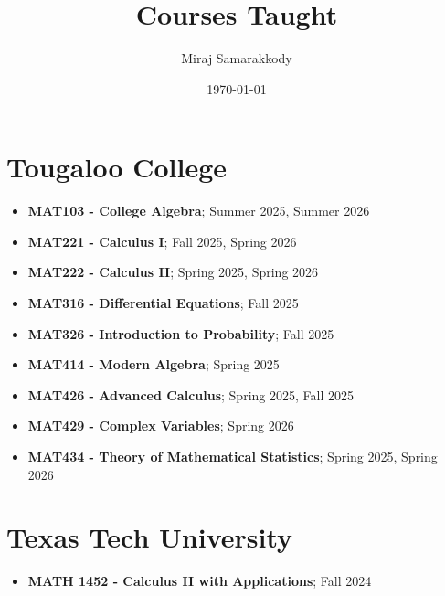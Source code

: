 \documentclass[11pt]{article}
\title{Courses Taught}
\author{Miraj Samarakkody}
\date{\today}
\begin{document}
\maketitle

\section*{Tougaloo College}
\begin{itemize}
	\item \textbf{MAT103 - College Algebra}; Summer 2025, Summer 2026
	\item \textbf{MAT221 - Calculus I}; Fall 2025, Spring 2026
	\item \textbf{MAT222 - Calculus II}; Spring 2025, Spring 2026
	\item \textbf{MAT316 - Differential Equations}; Fall 2025
	\item \textbf{MAT326 - Introduction to Probability}; Fall 2025
	\item \textbf{MAT414 - Modern Algebra}; Spring 2025
	\item \textbf{MAT426 - Advanced Calculus}; Spring 2025, Fall 2025
	\item \textbf{MAT429 - Complex Variables}; Spring 2026
	\item \textbf{MAT434 - Theory of Mathematical Statistics}; Spring 2025, Spring 2026
\end{itemize}

\section*{Texas Tech University}
\begin{itemize}
	\item \textbf{MATH 1452 - Calculus II with Applications}; Fall 2024
\end{itemize}
\end{document}
